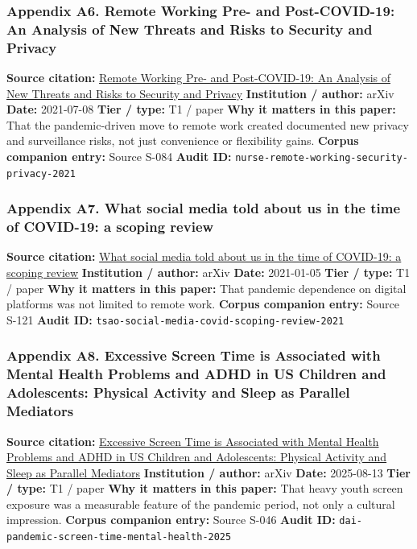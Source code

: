 \documentclass[
  american,
  11pt,
  letterpaper,
]{article}
\begin{document}
\subsubsection{Appendix A6. Remote Working Pre- and Post-COVID-19: An
Analysis of New Threats and Risks to Security and
Privacy}\label{appendix-a6-remote-working-pre-and-post-covid-19-an-analysis-of-new-threats-and-risks-to-security-and-privacy}

\textbf{Source citation:} \href{https://arxiv.org/abs/2107.03907}{Remote
Working Pre- and Post-COVID-19: An Analysis of New Threats and Risks to
Security and Privacy} \textbf{Institution / author:} arXiv
\textbf{Date:} 2021-07-08 \textbf{Tier / type:} T1 / paper \textbf{Why
it matters in this paper:} That the pandemic-driven move to remote work
created documented new privacy and surveillance risks, not just
convenience or flexibility gains. \textbf{Corpus companion entry:}
Source S-084 \textbf{Audit ID:}
\texttt{nurse-remote-working-security-privacy-2021}

\subsubsection{Appendix A7. What social media told about us in the time
of COVID-19: a scoping
review}\label{appendix-a7-what-social-media-told-about-us-in-the-time-of-covid-19-a-scoping-review}

\textbf{Source citation:} \href{https://arxiv.org/abs/2101.01688}{What
social media told about us in the time of COVID-19: a scoping review}
\textbf{Institution / author:} arXiv \textbf{Date:} 2021-01-05
\textbf{Tier / type:} T1 / paper \textbf{Why it matters in this paper:}
That pandemic dependence on digital platforms was not limited to remote
work. \textbf{Corpus companion entry:} Source S-121 \textbf{Audit ID:}
\texttt{tsao-social-media-covid-scoping-review-2021}

\subsubsection{Appendix A8. Excessive Screen Time is Associated with
Mental Health Problems and ADHD in US Children and Adolescents: Physical
Activity and Sleep as Parallel
Mediators}\label{appendix-a8-excessive-screen-time-is-associated-with-mental-health-problems-and-adhd-in-us-children-and-adolescents-physical-activity-and-sleep-as-parallel-mediators}

\textbf{Source citation:}
\href{https://arxiv.org/abs/2508.10062}{Excessive Screen Time is
Associated with Mental Health Problems and ADHD in US Children and
Adolescents: Physical Activity and Sleep as Parallel Mediators}
\textbf{Institution / author:} arXiv \textbf{Date:} 2025-08-13
\textbf{Tier / type:} T1 / paper \textbf{Why it matters in this paper:}
That heavy youth screen exposure was a measurable feature of the
pandemic period, not only a cultural impression. \textbf{Corpus
companion entry:} Source S-046 \textbf{Audit ID:}
\texttt{dai-pandemic-screen-time-mental-health-2025}
\end{document}
